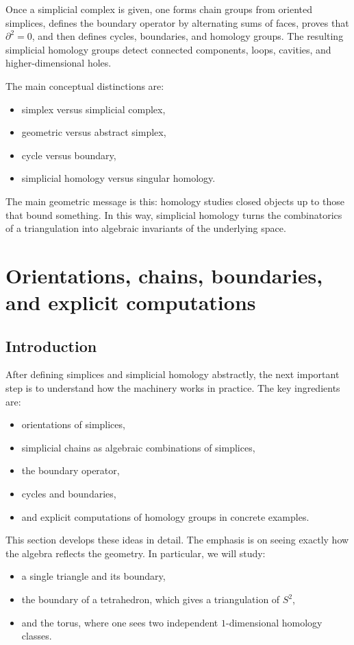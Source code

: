 \documentclass[12pt,a4paper]{article}
\theoremstyle{notespace}
\begin{document}
Once a simplicial complex is given, one forms chain groups from oriented simplices, defines the boundary operator by alternating sums of faces, proves that \(\partial^2=0\), and then defines cycles, boundaries, and homology groups. The resulting simplicial homology groups detect connected components, loops, cavities, and higher-dimensional holes.

The main conceptual distinctions are:
\begin{itemize}
	\item simplex versus simplicial complex,
	\item geometric versus abstract simplex,
	\item cycle versus boundary,
	\item simplicial homology versus singular homology.
\end{itemize}

The main geometric message is this: homology studies closed objects up to those that bound something. In this way, simplicial homology turns the combinatorics of a triangulation into algebraic invariants of the underlying space.

\section{Orientations, chains, boundaries, and explicit computations}

\subsection{Introduction}

After defining simplices and simplicial homology abstractly, the next important step is to understand how the machinery works in practice. The key ingredients are:
\begin{itemize}
	\item orientations of simplices,
	\item simplicial chains as algebraic combinations of simplices,
	\item the boundary operator,
	\item cycles and boundaries,
	\item and explicit computations of homology groups in concrete examples.
\end{itemize}

This section develops these ideas in detail. The emphasis is on seeing exactly how the algebra reflects the geometry. In particular, we will study:
\begin{itemize}
	\item a single triangle and its boundary,
	\item the boundary of a tetrahedron, which gives a triangulation of \(S^2\),
	\item and the torus, where one sees two independent \(1\)-dimensional homology classes.
\end{itemize}
\end{document}
